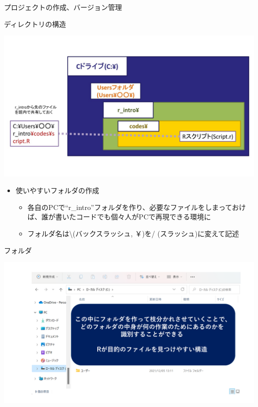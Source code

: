 \documentclass[
  ignorenonframetext,
]{beamer}
\providecommand{\tightlist}{%
  \setlength{\itemsep}{0pt}\setlength{\parskip}{0pt}}
\begin{document}
\begin{frame}[fragile]{プロジェクトの作成、バージョン管理}
\begin{block}{ディレクトリの構造}
\protect\hypertarget{ux30c7ux30a3ux30ecux30afux30c8ux30eaux306eux69cbux9020}{}
\begin{center}\includegraphics[width=0.77\linewidth]{figs/folder} \end{center}

\begin{itemize}
\tightlist
\item
  使いやすいフォルダの作成

  \begin{itemize}
  \tightlist
  \item
    各自のPCで``r\_intro''フォルダを作り、必要なファイルをしまっておけば、誰が書いたコードでも個々人がPCで再現できる環境に
  \item
    フォルダ名は\textbackslash(バックスラッシュ, ￥)を/
    (スラッシュ)に変えて記述
  \end{itemize}
\end{itemize}
\end{block}

\begin{block}{フォルダ}
\protect\hypertarget{ux30d5ux30a9ux30ebux30c0}{}
\begin{center}\includegraphics[width=0.95\linewidth]{figs/directory_system} \end{center}
\end{block}


\end{frame}
\end{document}
